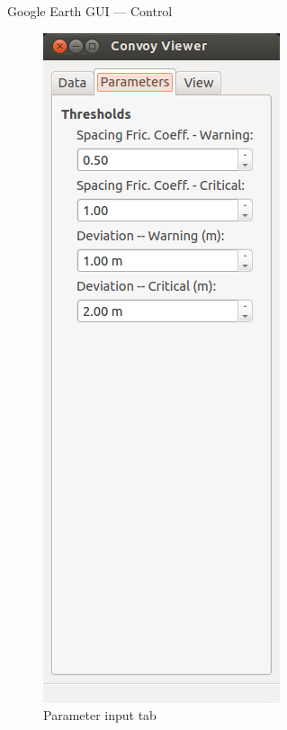 \documentclass{beamer}
\begin{document}
\begin{frame}{Google Earth GUI --- Control}
\begin{figure}[!htb]
          \includegraphics[height=0.85\textheight]{../graphics/earth_parameters.png}
          \caption{\footnotesize Parameter input tab}
        \endminipage\hfill
         \centering

\end{figure}
\end{frame}
\end{document}

